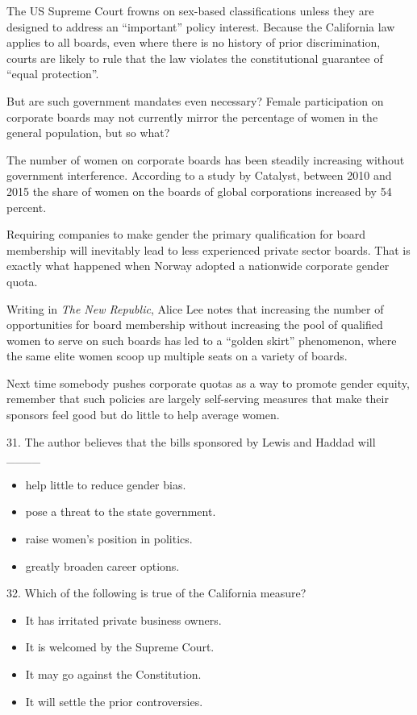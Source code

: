\documentclass[UTF8,11pt]{ctexart}
\begin{document}
The US Supreme Court frowns on sex-based classifications unless they are designed to address an “important” policy interest. Because the California law applies to all boards, even where there is no history of prior discrimination, courts are likely to rule that the law violates the constitutional guarantee of “equal protection”.


But are such government mandates even necessary? Female participation on corporate boards may not currently mirror the percentage of women in the general population, but so what?


The number of women on corporate boards has been steadily increasing without government interference. According to a study by Catalyst, between 2010 and 2015 the share of women on the boards of global corporations increased by 54 percent.


Requiring companies to make gender the primary qualification for board membership will inevitably lead to less experienced private sector boards. That is exactly what happened when Norway adopted a nationwide corporate gender quota.


Writing in \textit{The New Republic}, Alice Lee notes that increasing the number of opportunities for board membership without increasing the pool of qualified women to serve on such boards has led to a “golden skirt” phenomenon, where the same elite women scoop up multiple seats on a variety of boards.


Next time somebody pushes corporate quotas as a way to promote gender equity, remember that such policies are largely self-serving measures that make their sponsors feel good but do little to help average women.


31. The author believes that the bills sponsored by Lewis and Haddad will \_\_\_\_


\begin{itemize}[leftmargin=2em,itemsep=.2em,topsep=.4em]\item[A.] help little to reduce gender bias.
\item[B.] pose a threat to the state government.
\item[C.] raise women’s position in politics.
\item[D.] greatly broaden career options.
\end{itemize}

32. Which of the following is true of the California measure?


\begin{itemize}[leftmargin=2em,itemsep=.2em,topsep=.4em]\item[A.] It has irritated private business owners.
\item[B.] It is welcomed by the Supreme Court.
\item[C.] It may go against the Constitution.
\item[D.] It will settle the prior controversies.
\end{itemize}
\end{document}
